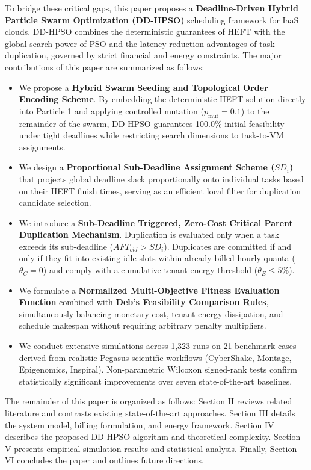 \documentclass[journal]{IEEEtran}
\begin{document}
To bridge these critical gaps, this paper proposes a \textbf{Deadline-Driven Hybrid Particle Swarm Optimization (DD-HPSO)} scheduling framework for IaaS clouds. DD-HPSO combines the deterministic guarantees of HEFT with the global search power of PSO and the latency-reduction advantages of task duplication, governed by strict financial and energy constraints. The major contributions of this paper are summarized as follows:
\begin{itemize}
    \item We propose a \textbf{Hybrid Swarm Seeding and Topological Order Encoding Scheme}. By embedding the deterministic HEFT solution directly into Particle 1 and applying controlled mutation ($p_{\text{mut}} = 0.1$) to the remainder of the swarm, DD-HPSO guarantees 100.0\% initial feasibility under tight deadlines while restricting search dimensions to task-to-VM assignments.
    \item We design a \textbf{Proportional Sub-Deadline Assignment Scheme ($SD_i$)} that projects global deadline slack proportionally onto individual tasks based on their HEFT finish times, serving as an efficient local filter for duplication candidate selection.
    \item We introduce a \textbf{Sub-Deadline Triggered, Zero-Cost Critical Parent Duplication Mechanism}. Duplication is evaluated only when a task exceeds its sub-deadline ($AFT_{old} > SD_i$). Duplicates are committed if and only if they fit into existing idle slots within already-billed hourly quanta ($\theta_C = 0$) and comply with a cumulative tenant energy threshold ($\theta_E \le 5\%$).
    \item We formulate a \textbf{Normalized Multi-Objective Fitness Evaluation Function} combined with \textbf{Deb's Feasibility Comparison Rules}, simultaneously balancing monetary cost, tenant energy dissipation, and schedule makespan without requiring arbitrary penalty multipliers.
    \item We conduct extensive simulations across 1,323 runs on 21 benchmark cases derived from realistic Pegasus scientific workflows (CyberShake, Montage, Epigenomics, Inspiral). Non-parametric Wilcoxon signed-rank tests confirm statistically significant improvements over seven state-of-the-art baselines.
\end{itemize}

The remainder of this paper is organized as follows: Section II reviews related literature and contrasts existing state-of-the-art approaches. Section III details the system model, billing formulation, and energy framework. Section IV describes the proposed DD-HPSO algorithm and theoretical complexity. Section V presents empirical simulation results and statistical analysis. Finally, Section VI concludes the paper and outlines future directions.
\end{document}
